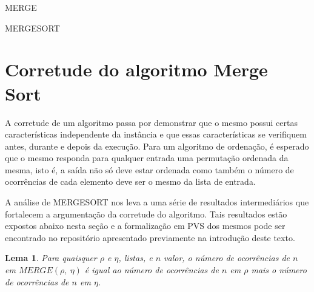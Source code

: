 \documentclass[12pt]{article}
\newtheorem{lemma}[theorem]{Lema}
\begin{document}
\begin{algorithm}[H]
        \caption{MERGE}
\end{algorithm}

\begin{algorithm}[H]
        \caption{MERGESORT}
\end{algorithm}

\section{Corretude do algoritmo Merge Sort}
\label{correctness}

A corretude de um algoritmo passa por demonstrar que o mesmo possui certas características independente da instância e que essas características
se verifiquem antes, durante e depois da execução. Para um algoritmo de ordenação, é esperado que o mesmo responda para qualquer entrada uma permutação
ordenada da mesma, isto é, a saída não só deve estar ordenada como também o número de ocorrências de cada elemento deve ser o mesmo da lista de entrada.

A análise de MERGESORT nos leva a uma série de resultados intermediários que fortalecem a argumentação da corretude do algoritmo. Tais resultados estão expostos
abaixo nesta seção e a formalização em PVS dos mesmos pode ser encontrado no repositório apresentado previamente na introdução deste texto.

\begin{lemma}
\label{merge-preserves-occurrences}
        Para quaisquer $\rho$ e $\eta$, listas, e $n$ valor, o número de ocorrências de $n$ em $MERGE(\rho,\ \eta)$ é igual ao número de ocorrências
        de $n$ em $\rho$ mais o número de ocorrências de $n$ em $\eta$.
\end{lemma}
\end{document}
